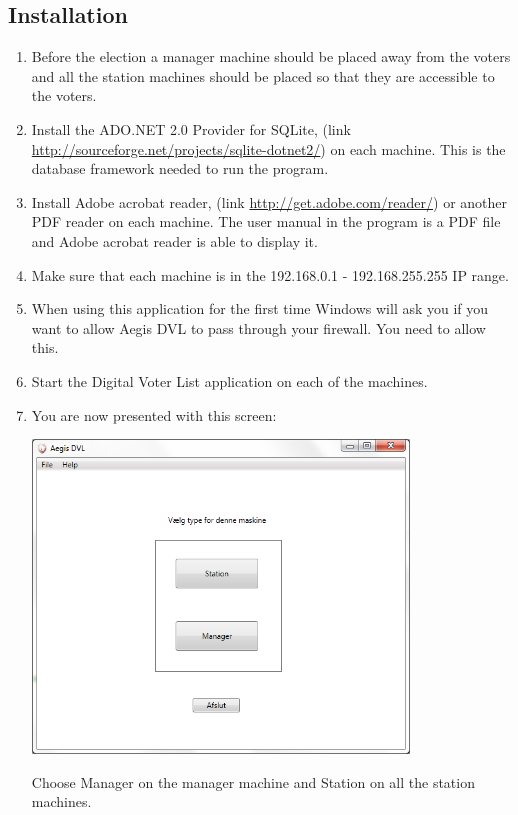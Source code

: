 \documentclass[a4paper]{report}
\begin{document}
\subsection*{Installation}
\begin{enumerate}
\item Before the election a manager machine should be placed away from the voters and all the station machines should be placed so that they are accessible to the voters.
\item Install the ADO.NET 2.0 Provider for SQLite, (link \url{http://sourceforge.net/projects/sqlite-dotnet2/}) on each machine. This is the database framework needed to run the program.
\item Install Adobe acrobat reader, (link \url{http://get.adobe.com/reader/}) or another PDF reader on each machine. The user manual in the program is a PDF file and Adobe acrobat reader is able to display it.
\item Make sure that each machine is in the 192.168.0.1 - 192.168.255.255 IP range.
\item When using this application for the first time Windows will ask you if you want to allow Aegis DVL to pass through your firewall. You need to allow this.
\item Start the Digital Voter List application on each of the machines.
\item You are now presented with this screen: \\
\begin{center}
\includegraphics[width=100mm]{TypeChoice.png}
\end{center}
Choose Manager on the manager machine and Station on all the station machines.
\end{enumerate}
\end{document}

